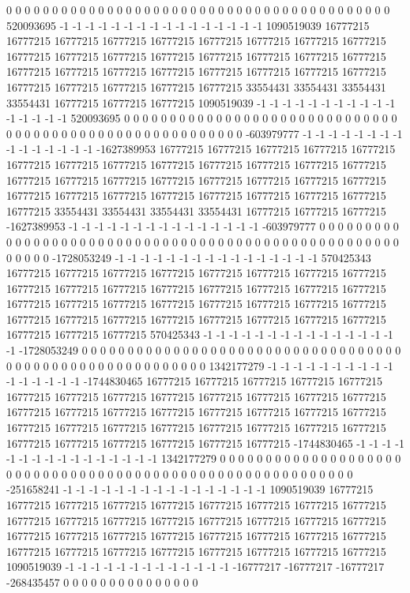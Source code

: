 0 0 0 0 0 0 0 0 0 0 0 0 0 0 0 0 0 0 0 0 0 0 0 0 0 0 0 0 0 0 0 0 0 0 0 0 0 0 0 0 0 0 520093695 -1 -1 -1 -1 -1 -1 -1 -1 -1 -1 -1 -1 -1 -1 -1 -1 1090519039 16777215 16777215 16777215 16777215 16777215 16777215 16777215 16777215 16777215 16777215 16777215 16777215 16777215 16777215 16777215 16777215 16777215 16777215 16777215 16777215 16777215 16777215 16777215 16777215 16777215 16777215 16777215 16777215 16777215 16777215 33554431 33554431 33554431 33554431 16777215 16777215 16777215 1090519039 -1 -1 -1 -1 -1 -1 -1 -1 -1 -1 -1 -1 -1 -1 -1 -1 520093695 0 0 0 0 0 0 0 0 0 0 0 0 0
0 0 0 0 0 0 0 0 0 0 0 0 0 0 0 0 0 0 0 0 0 0 0 0 0 0 0 0 0 0 0 0 0 0 0 0 0 0 0 0 0 0 0 -603979777 -1 -1 -1 -1 -1 -1 -1 -1 -1 -1 -1 -1 -1 -1 -1 -1627389953 16777215 16777215 16777215 16777215 16777215 16777215 16777215 16777215 16777215 16777215 16777215 16777215 16777215 16777215 16777215 16777215 16777215 16777215 16777215 16777215 16777215 16777215 16777215 16777215 16777215 16777215 16777215 16777215 16777215 16777215 33554431 33554431 33554431 33554431 16777215 16777215 16777215 -1627389953 -1 -1 -1 -1 -1 -1 -1 -1 -1 -1 -1 -1 -1 -1 -1 -603979777 0 0 0 0 0 0 0 0 0 0 0 0 0 0
0 0 0 0 0 0 0 0 0 0 0 0 0 0 0 0 0 0 0 0 0 0 0 0 0 0 0 0 0 0 0 0 0 0 0 0 0 0 0 0 0 0 0 -1728053249 -1 -1 -1 -1 -1 -1 -1 -1 -1 -1 -1 -1 -1 -1 -1 -1 570425343 16777215 16777215 16777215 16777215 16777215 16777215 16777215 16777215 16777215 16777215 16777215 16777215 16777215 16777215 16777215 16777215 16777215 16777215 16777215 16777215 16777215 16777215 16777215 16777215 16777215 16777215 16777215 16777215 16777215 16777215 16777215 16777215 16777215 16777215 16777215 570425343 -1 -1 -1 -1 -1 -1 -1 -1 -1 -1 -1 -1 -1 -1 -1 -1 -1728053249 0 0 0 0 0 0 0 0 0 0 0 0 0 0
0 0 0 0 0 0 0 0 0 0 0 0 0 0 0 0 0 0 0 0 0 0 0 0 0 0 0 0 0 0 0 0 0 0 0 0 0 0 0 0 0 0 0 1342177279 -1 -1 -1 -1 -1 -1 -1 -1 -1 -1 -1 -1 -1 -1 -1 -1 -1744830465 16777215 16777215 16777215 16777215 16777215 16777215 16777215 16777215 16777215 16777215 16777215 16777215 16777215 16777215 16777215 16777215 16777215 16777215 16777215 16777215 16777215 16777215 16777215 16777215 16777215 16777215 16777215 16777215 16777215 16777215 16777215 16777215 16777215 16777215 16777215 -1744830465 -1 -1 -1 -1 -1 -1 -1 -1 -1 -1 -1 -1 -1 -1 -1 -1 1342177279 0 0 0 0 0 0 0 0 0 0 0 0 0 0
0 0 0 0 0 0 0 0 0 0 0 0 0 0 0 0 0 0 0 0 0 0 0 0 0 0 0 0 0 0 0 0 0 0 0 0 0 0 0 0 0 0 0 0 -251658241 -1 -1 -1 -1 -1 -1 -1 -1 -1 -1 -1 -1 -1 -1 -1 -1 1090519039 16777215 16777215 16777215 16777215 16777215 16777215 16777215 16777215 16777215 16777215 16777215 16777215 16777215 16777215 16777215 16777215 16777215 16777215 16777215 16777215 16777215 16777215 16777215 16777215 16777215 16777215 16777215 16777215 16777215 16777215 16777215 16777215 16777215 1090519039 -1 -1 -1 -1 -1 -1 -1 -1 -1 -1 -1 -1 -1 -16777217 -16777217 -16777217 -268435457 0 0 0 0 0 0 0 0 0 0 0 0 0 0 0
